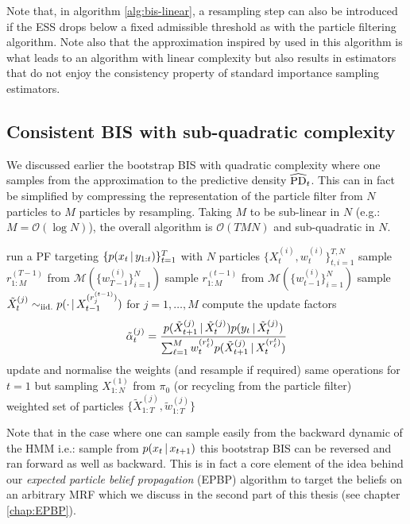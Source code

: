 Note that, in algorithm \ref{alg:bis-linear}, a resampling step can also be introduced if the ESS drops below a fixed admissible threshold as with the particle filtering algorithm. 
Note also that the approximation inspired by \citet{briers05} used in this algorithm is what leads to an algorithm with linear complexity but also results in estimators that do not enjoy the consistency property of standard importance sampling estimators.

\subsection{Consistent BIS with sub-quadratic complexity}
%
We discussed earlier the bootstrap BIS with quadratic complexity where one samples from the approximation to the predictive density $\widehat{\text{PD}}_{t}$.
This can in fact be simplified by compressing the representation of the particle filter from $N$ particles to $M$ particles by resampling. Taking $M$ to be sub-linear in $N$ (e.g.: $M=\mathcal O(\log N)$), the overall algorithm is $\mathcal O(TMN)$ and sub-quadratic in $N$.

%
\begin{algorithm}[!h]\small
	\caption{\label{alg:bis-sublin}}
	\begin{algorithmic}[1]
		\State run a PF targeting $\{p(x_{t}\,|\, y_{1:t})\}_{t=1}^{T}$ with $N$ particles $\{X^{(i)}_{t}, w^{(i)}_{t}\}_{t,i=1}^{T,N}$
		\State sample $r^{(T-1)}_{1:M}$ from $\mathcal M(\{w^{(i)}_{T-1}\}_{i=1}^{N})$ 
			\State sample $r^{(t-1)}_{1:M}$ from $\mathcal M(\{w^{(i)}_{t-1}\}_{i=1}^{N})$ 
			\State sample $\tilde X^{(j)}_{t}\sim_{\mathrm{iid.}} p(\cdot\,|\, X^{(r^{(t-1)}_{j})}_{t-1})$  for $j=1,\dots,M$
			\State compute the update factors $$\tilde \alpha^{(j)}_{t} = {p(\tilde X^{(j)}_{t+1}\,|\, \tilde X^{(j)}_{t})p(y_{t}\,|\, \tilde X^{(j)}_{t})\over \sum_{\ell=1}^{M} w^{(r^{t}_{\ell})}_{t} p(\tilde X^{(j)}_{t+1} \,|\, X^{(r^{t}_{\ell})}_{t})  }$$
			\State update and normalise the weights (and resample if required)
		\EndFor
		\State same operations for $t=1$ but sampling $X^{(1)}_{1:N}$ from $\pi_{0}$ (or recycling from the particle filter)\\
		\Return weighted set of particles $\{\tilde X^{(j)}_{1:T}, \tilde w^{(j)}_{1:T}\}$
	\end{algorithmic}
\end{algorithm}
%

Note that in the case where one can sample easily from the backward dynamic of the HMM i.e.: sample from $p(x_{t}\,|\, x_{t+1})$ this bootstrap BIS can be reversed and ran forward as well as backward. 
This is in fact a core element of the idea behind our \emph{expected particle belief propagation} (EPBP) algorithm to target the beliefs on an arbitrary MRF which we discuss in the second part of this thesis (see chapter \ref{chap:EPBP}).

